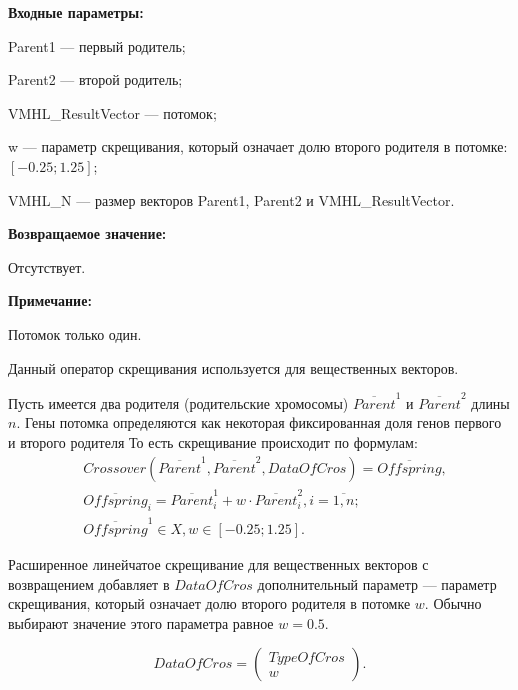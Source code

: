 \textbf{Входные параметры:}
 
Parent1 --- первый родитель;
 
Parent2 --- второй родитель;
 
VMHL\_ResultVector --- потомок;

w --- параметр скрещивания, который означает долю второго родителя в потомке: $[-0.25;1.25]$;
 
VMHL\_N --- размер векторов Parent1, Parent2 и VMHL\_ResultVector.

\textbf{Возвращаемое значение:}

 Отсутствует.
 
\textbf{ Примечание:}

 Потомок только один.
 
Данный оператор скрещивания используется для вещественных векторов.

Пусть имеется два родителя (родительские хромосомы) $ \overline{Parent}^1 $ и $ \overline{Parent}^2$ длины $n$. Гены потомка определяются как некоторая фиксированная доля генов первого и второго родителя То есть скрещивание происходит по формулам:
\begin{align}
\label{SetOfOperatorsAlgorithms:eq:ExtendedLineForReal}
&Crossover \left( \overline{Parent}^1, \overline{Parent}^2, DataOfCros\right)=\overline{Offspring}, \\
& \overline{Offspring}_i=\overline{Parent}^1_i+w\cdot\overline{Parent}^2_i , i=\overline{1,n};\nonumber\\
&\overline{Offspring}^1\in X, w\in \left[ -0.25; 1.25\right] .\nonumber
\end{align}

Расширенное линейчатое скрещивание для вещественных векторов с возвращением добавляет в $ DataOfCros $ дополнительный параметр --- параметр скрещивания, который означает долю второго родителя в потомке $ w $. Обычно выбирают значение этого параметра равное $ w=0.5 $.

\begin{equation}
DataOfCros=\left( \begin{array}{c} TypeOfCros \\ w \end{array} \right).
\end{equation}